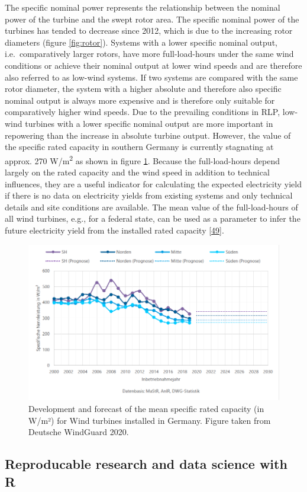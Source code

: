 \documentclass[a4paper,11pt]{article}
\begin{document}
The specific nominal power represents the relationship between the nominal power of the turbine and the swept rotor area. The specific nominal power of the turbines has tended to decrease since 2012, which is due to the increasing rotor diameters (figure \ref{fig:rotor}). Systems with a lower specific nominal output, i.e.~comparatively larger rotors, have more full-load-hours under the same wind conditions or achieve their nominal output at lower wind speeds and are therefore also referred to as low-wind systems. If two systems are compared with the same rotor diameter, the system with a higher absolute and therefore also specific nominal output is always more expensive and is therefore only suitable for comparatively higher wind speeds. Due to the prevailing conditions in RLP, low-wind turbines with a lower specific nominal output are more important in repowering than the increase in absolute turbine output. However, the value of the specific rated capacity in southern Germany is currently stagnating at approx. 270 W/m\textsuperscript{2} as shown in figure \ref{fig:spec}. Because the full-load-hours depend largely on the rated capacity and the wind speed in addition to technical influences, they are a useful indicator for calculating the expected electricity yield if there is no data on electricity yields from existing systems and only technical details and site conditions are available. The mean value of the full-load-hours of all wind turbines, e.g., for a federal state, can be used as a parameter to infer the future electricity yield from the installed rated capacity {[}\protect\hyperlink{ref-RasmusBorrmannDr.KnudRehfeldtDr.DennisKruse.2020}{49}{]}.
\begin{figure}[H]

{\centering \includegraphics[width=1\linewidth]{figures/DWG/DWG_Spezifische_Nennleistung} 

}

\caption{Development and forecast of the mean specific rated capacity (in W/m²) for Wind turbines installed in Germany. Figure taken from Deutsche WindGuard 2020.}\label{fig:spec}
\end{figure}
\hypertarget{reproducable-research-and-data-science-with-r}{%
\subsection{Reproducable research and data science with R}\label{reproducable-research-and-data-science-with-r}}
\end{document}
